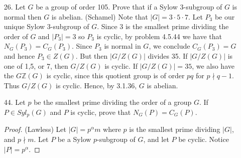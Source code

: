\documentclass[10pt]{article}
\newcommand{\Z}{\mathbb{Z}}
\newcommand{\divides}{\, \Big | \,}
\newcommand{\gen}[1]{\left\langle #1 \right\rangle}
\newcommand{\zmod}[1]{\Z/#1 \Z}
\newcommand\inv{^{-1}}
\begin{document}
\begin{itemize}
\begin{proof}
Since $n_7=1$, $\text{Syl}_{7}(G)=\{P_7\}$ and $P_7$ must be cyclic since $|P_7|=7$, a prime. Let $a \in P_7$ such that $P_7=\gen{a}$. Let $G$ act on $P_7$ by conjugation. Then the associated homomorphism:
\begin{equation*}
\varphi: \quad G \rightarrow S_{P_7} \cong S_7
\end{equation*}
is well-defined (since $gP_7g^{-1}=P_7$ for all $g \in G$ by Corollary 20). Furthermore, $S_7$ can be viewed as the group of automorphisms of $P_7$, and since $P_7$ is cyclic, $\text{Aut}(P_7) \cong \zmod{(7-1)}$ by Proposition 17 (1) p. 136. Therefore, if $K$ denotes the kernel of $\varphi$, we have
\begin{equation*}
G / K \cong \varphi(G) \leq \zmod{6}.
\end{equation*}
 So $$\frac{|G|}{|K|} \divides 6 \quad \Rightarrow \quad K=G \quad \text{ since }2,3 \nmid |G|.$$
But by definition, $K=\ker \varphi= \{ g \in G \ | \ ga^kg\inv=a^k \ \forall k \in \Z \}$, so
\begin{equation*}
\forall \ a^k \in P_7: \qquad ga^k=a^kg \quad \text{ for all }g \in G.
\end{equation*}
Hence $P_7 \leq Z(G)$.

We also have that $n_{11}=1$, so the unique Sylow 11-subgroup of $G$ is normal in $G$ (by Corollary 20). 
\end{proof}


\item[26.]   Let $G$ be a group of order 105.  Prove that if a Sylow 3-subgroup of $G$ is normal then $G$ is abelian.
(Schamel)
Note that $|G| = 3\cdot 5 \cdot 7$.  Let $P_3$ be our unique Sylow 3-subgroup of $G$.  Since $3$ is the smallest prime dividing the order of $G$ and $|P_3|=3$ so $P_3$ is cyclic, by problem 4.5.44 we have that $N_G(P_3) = C_G(P_3)$.  Since $P_3$ is normal in $G$, we conclude $C_G(P_3) = G$ and hence $P_3 \in Z(G)$.  But then $|G/Z(G)|$ divides 35.  If $|G/Z(G)|$ is one of 1,5, or 7, then $G/Z(G)$ is cyclic.  If $|G/Z(G)| = 35$, we also have the $G\Z(G)$ is cyclic, since
this quotient group is of order $pq$ for $p \nmid q-1$.  Thus $G/Z(G)$ is cyclic.  Hence, by 3.1.36, $G$ is abelian.

\item[44.] Let $p$ be the smallest prime dividing the order of a group $G$. If $P \in Syl_p(G)$ and $P$ is cyclic, prove that $N_G(P) = C_G(P)$. 

\begin{proof} (Lawless)
Let $|G| = p^{\alpha}m$ where $p$ is the smallest prime dividing $|G|$, and $p \nmid m$. Let $P$ be a Sylow $p$-subgroup of $G$, and let $P$ be cyclic. Notice $|P| = p^{\alpha}$. 


\end{proof}
\end{itemize}
\end{document}
